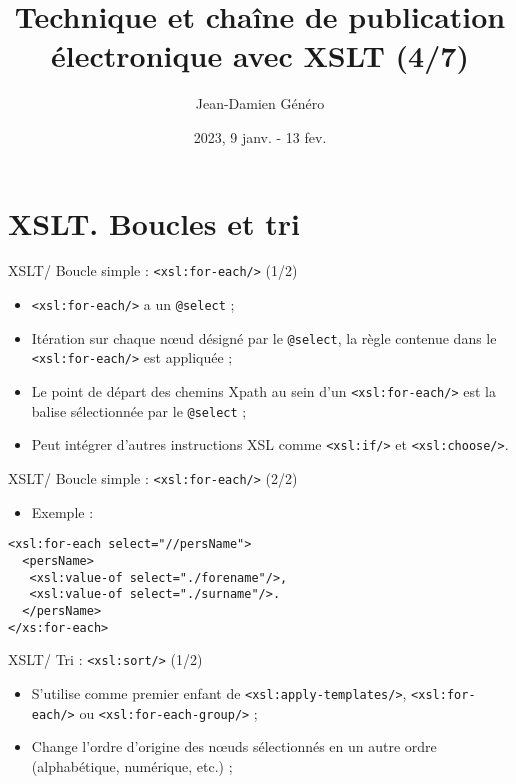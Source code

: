 \documentclass{beamer}
\title{Technique et chaîne de publication électronique avec XSLT (4/7)}
\date{2023, 9 janv. - 13 fev.}
\author{Jean-Damien Généro}
\institute{École nationale des chartes -- M2 TNAH}
\begin{document}
    \maketitle

    \section{XSLT. Boucles et tri}

    \begin{frame}{XSLT/ Boucle simple : \texttt{<xsl:for-each/>} (1/2)}
        \Large
        \begin{itemize}
            \item \texttt{<xsl:for-each/>} a un \texttt{@select} ;
            \bigskip
            \item Itération sur chaque n\oe ud désigné par le \texttt{@select}, la règle contenue dans le \texttt{<xsl:for-each/>} est appliquée ;
            \bigskip
            \item Le point de départ des chemins Xpath au sein d'un \texttt{<xsl:for-each/>} est la balise sélectionnée par le \texttt{@select} ;
            \bigskip
            \item Peut intégrer d'autres instructions XSL comme \texttt{<xsl:if/>} et \texttt{<xsl:choose/>}.
        \end{itemize}
    \end{frame}

    \begin{frame}[fragile]{XSLT/ Boucle simple : \texttt{<xsl:for-each/>} (2/2)}
        \Large
        \begin{itemize}
            \item Exemple :
        \end{itemize}
        \begin{verbatim}
<xsl:for-each select="//persName">
  <persName>
   <xsl:value-of select="./forename"/>,
   <xsl:value-of select="./surname"/>.
  </persName>
</xs:for-each>
        \end{verbatim}
    \end{frame}

    \begin{frame}{XSLT/ Tri : \texttt{<xsl:sort/>} (1/2)}
        \Large
        \begin{itemize}
            \item S'utilise comme premier enfant de \texttt{<xsl:apply-templates/>}, \texttt{<xsl:for-each/>} ou \texttt{<xsl:for-each-group/>} ;
            \bigskip
            \item Change l'ordre d'origine des n\oe uds sélectionnés en un autre ordre (alphabétique, numérique, etc.) ;
        \end{itemize}
    \end{frame}
\end{document}
